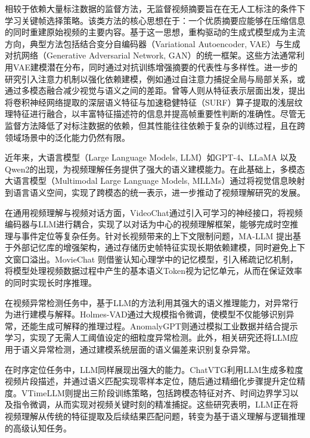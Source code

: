 相较于依赖大量标注数据的监督方法，无监督视频摘要旨在在无人工标注的条件下学习关键帧选择策略。该类方法的核心思想在于：一个优质摘要应能够在压缩信息的同时重建原始视频的主要内容。基于这一思想，重构驱动的生成式模型成为主流方向，典型方法包括结合变分自编码器（Variational Autoencoder, VAE）\cite{kingma2013auto}与生成对抗网络（Generative Adversarial Network, GAN）\cite{goodfellow2014generative}的统一框架\cite{mahasseni2017unsupervised,apostolidis2019stepwise}。这些方法通常利用VAE建模潜在分布，同时通过对抗训练增强摘要的代表性与多样性。进一步的研究引入注意力机制以强化依赖建模，例如通过自注意力捕捉全局与局部关系\cite{jung2020global}，或通过多模态融合减少视觉与语义之间的差距\cite{lin2022deep}。曾等人\cite{zeng2023deepshallow}则从特征表示层面出发，提出将卷积神经网络提取的深层语义特征与加速稳健特征（SURF）算子提取的浅层纹理特征进行融合，以丰富特征描述符的信息并提高帧重要性判断的准确性。尽管无监督方法降低了对标注数据的依赖，但其性能往往依赖于复杂的训练过程，且在跨领域场景中的泛化能力仍然有限。

近年来，大语言模型（Large Language Models, LLM）如GPT-4\cite{achiam2023gpt}、LLaMA\cite{touvron2023llama} 以及Qwen2\cite{yang2024qwen2}的出现，为视频理解任务提供了强大的语义建模能力。在此基础上，多模态大语言模型（Multimodal Large Language Models, MLLMs）通过将视觉信息映射到语言语义空间，实现了跨模态的统一表示，进一步推动了视频理解研究的发展。

在通用视频理解与视频对话方面，VideoChat\cite{li2023videochat}通过引入可学习的神经接口，将视频编码器与LLM进行耦合，实现了以对话为中心的视频理解框架，能够完成时空推理与事件定位等复杂任务。针对长视频带来的上下文限制问题，MA-LLM\cite{he2024ma} 提出基于外部记忆库的增强架构，通过存储历史帧特征实现长期依赖建模，同时避免上下文窗口溢出。MovieChat\cite{song2024moviechat} 则借鉴认知心理学中的记忆模型，引入稀疏记忆机制，将模型处理视频数据过程中产生的基本语义Token视为记忆单元，从而在保证效率的同时实现长时序推理。

在视频异常检测任务中，基于LLM的方法利用其强大的语义推理能力，对异常行为进行建模与解释。Holmes-VAD\cite{zhang2024holmes}通过大规模指令微调，使模型不仅能够识别异常，还能生成可解释的推理过程。AnomalyGPT\cite{gu2024anomalygpt}则通过模拟工业数据并结合提示学习，实现了无需人工阈值设定的细粒度异常检测。此外，相关研究还将LLM应用于语义异常检测，通过建模系统层面的语义偏差来识别复杂异常\cite{elhafsi2023semantic}。

在时序定位任务中，LLM同样展现出强大的能力。ChatVTG\cite{qu2024chatvtg}利用LLM生成多粒度视频片段描述，并通过语义匹配实现零样本定位，随后通过精细化步骤提升定位精度。VTimeLLM\cite{huang2024vtimellm}则提出三阶段训练策略，包括跨模态特征对齐、时间边界学习以及指令微调，从而实现对视频关键时刻的精准捕捉。这些研究表明，LLM正在将视频理解从传统的特征提取及后续结果匹配问题，转变为基于语义理解与逻辑推理的高级认知任务。

